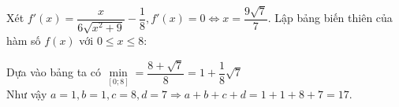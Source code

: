 \begin{ex}
{		Xét $f'(x) = \dfrac{x}{6\sqrt{x^2 + 9}} - \dfrac{1}{8}, f'(x) = 0 \Leftrightarrow x = \dfrac{9\sqrt{7}}{7}$.
		Lập bảng biến thiên của hàm số $f(x)$ với $0 \leq x \le 8$:
		\begin{center}
		\end{center}
		Dựa vào bảng ta có $\min \limits_{[0;8]} = \dfrac{8 + \sqrt{7}}{8} = 1 + \dfrac{1}{8}\sqrt{7}$ \\
		Như vậy $a = 1, b = 1, c = 8, d = 7 \Rightarrow a + b + c + d = 1 + 1 + 8 + 7 = 17$.
	}
\end{ex}

